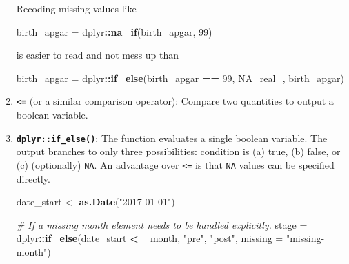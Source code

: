 \documentclass[
]{book}
\newenvironment{Shaded}{\begin{snugshade}}{\end{snugshade}}
\newcommand{\CommentTok}[1]{\textcolor[rgb]{0.56,0.35,0.01}{\textit{#1}}}
\newcommand{\DataTypeTok}[1]{\textcolor[rgb]{0.13,0.29,0.53}{#1}}
\newcommand{\DecValTok}[1]{\textcolor[rgb]{0.00,0.00,0.81}{#1}}
\newcommand{\KeywordTok}[1]{\textcolor[rgb]{0.13,0.29,0.53}{\textbf{#1}}}
\newcommand{\NormalTok}[1]{#1}
\newcommand{\OperatorTok}[1]{\textcolor[rgb]{0.81,0.36,0.00}{\textbf{#1}}}
\newcommand{\OtherTok}[1]{\textcolor[rgb]{0.56,0.35,0.01}{#1}}
\newcommand{\StringTok}[1]{\textcolor[rgb]{0.31,0.60,0.02}{#1}}
\begin{document}
\begin{enumerate}
  Recoding missing values like

\begin{Shaded}
\begin{Highlighting}[]
\NormalTok{birth\_apgar =}\StringTok{ }\NormalTok{dplyr}\OperatorTok{::}\KeywordTok{na\_if}\NormalTok{(birth\_apgar, }\DecValTok{99}\NormalTok{)}
\end{Highlighting}
\end{Shaded}

  is easier to read and not mess up than

\begin{Shaded}
\begin{Highlighting}[]
\NormalTok{birth\_apgar =}\StringTok{ }\NormalTok{dplyr}\OperatorTok{::}\KeywordTok{if\_else}\NormalTok{(birth\_apgar }\OperatorTok{==}\StringTok{ }\DecValTok{99}\NormalTok{, }\OtherTok{NA\_real\_}\NormalTok{, birth\_apgar)}
\end{Highlighting}
\end{Shaded}
\item
  \textbf{\texttt{\textless{}=}} (or a similar comparison operator): Compare two quantities to output a boolean variable.
\item
  \textbf{\texttt{dplyr::if\_else()}}: The function evaluates a single boolean variable. The output branches to only three possibilities: condition is (a) true, (b) false, or (c) (optionally) \texttt{NA}. An advantage over \texttt{\textless{}=} is that \texttt{NA} values can be specified directly.

\begin{Shaded}
\begin{Highlighting}[]
\NormalTok{date\_start <{-}}\StringTok{ }\KeywordTok{as.Date}\NormalTok{(}\StringTok{"2017{-}01{-}01"}\NormalTok{)}

\CommentTok{\# If a missing month element needs to be handled explicitly.}
\NormalTok{stage       =}\StringTok{ }\NormalTok{dplyr}\OperatorTok{::}\KeywordTok{if\_else}\NormalTok{(date\_start }\OperatorTok{<=}\StringTok{ }\NormalTok{month, }\StringTok{"pre"}\NormalTok{, }\StringTok{"post"}\NormalTok{, }\DataTypeTok{missing =} \StringTok{"missing{-}month"}\NormalTok{)}


\end{Highlighting}
\end{Shaded}
\end{enumerate}
\end{document}
